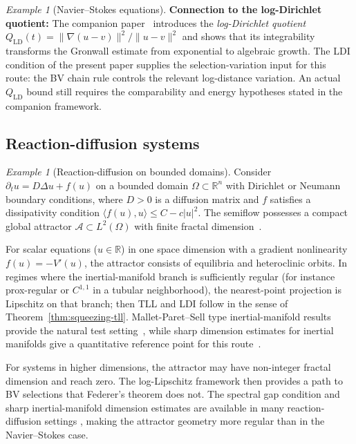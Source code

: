 \documentclass[12pt,a4paper]{article}
\theoremstyle{definition}
\theoremstyle{plain}
\theoremstyle{remark}
\newtheorem{example}[definition]{Example}
\begin{document}
\begin{example}[Navier--Stokes equations]
\medskip\noindent
\textbf{Connection to the log-Dirichlet quotient:}\;
The companion paper~\cite{FST-NS2026} introduces the
\emph{log-Dirichlet quotient}
$Q_{\mathrm{LD}}(t) = \|\nabla(u-v)\|^2 / \|u-v\|^2$
and shows that its integrability transforms the Gronwall estimate
from exponential to algebraic growth.  The LDI condition of the
present paper supplies the selection-variation input for this route:
the BV chain rule controls the relevant log-distance variation.
An actual $Q_{\mathrm{LD}}$ bound still requires the comparability
and energy hypotheses stated in the companion framework.
\end{example}

\subsection{Reaction-diffusion systems}

\begin{example}[Reaction-diffusion on bounded domains]
\label{ex:RD}
Consider $\partial_t u = D\Delta u + f(u)$ on a bounded domain
$\Omega \subset \mathbb{R}^n$ with Dirichlet or Neumann
boundary conditions, where $D > 0$ is a diffusion matrix and
$f$ satisfies a dissipativity condition
$\langle f(u), u \rangle \le C - c|u|^2$.  The semiflow
possesses a compact global attractor $\mathcal{A} \subset L^2(\Omega)$
with finite fractal dimension~\cite{Temam1997}.

For scalar equations ($u \in \mathbb{R}$) in one space dimension
with a gradient nonlinearity $f(u) = -V'(u)$, the attractor
consists of equilibria and heteroclinic orbits.  In regimes where
the inertial-manifold branch is sufficiently regular (for instance
prox-regular or $C^{1,1}$ in a tubular neighborhood), the
nearest-point projection is Lipschitz on that branch; then TLL and
LDI follow in the sense of Theorem~\ref{thm:squeezing-tll}.
Mallet-Paret--Sell type inertial-manifold results provide the
natural test setting~\cite{MalletParetSell1988}, while sharp dimension
estimates for inertial manifolds give a quantitative reference point
for this route~\cite{Romanov1994}.

For systems in higher dimensions, the attractor may have non-integer
fractal dimension and reach zero.  The log-Lipschitz framework then
provides a path to BV selections that Federer's theorem does not.
The spectral gap condition and sharp inertial-manifold dimension
estimates are available in many reaction-diffusion settings
\cite{EdenFoiasNicolaenkoTemam1994},
making the attractor geometry more regular than in the
Navier--Stokes case.
\end{example}
\end{document}
